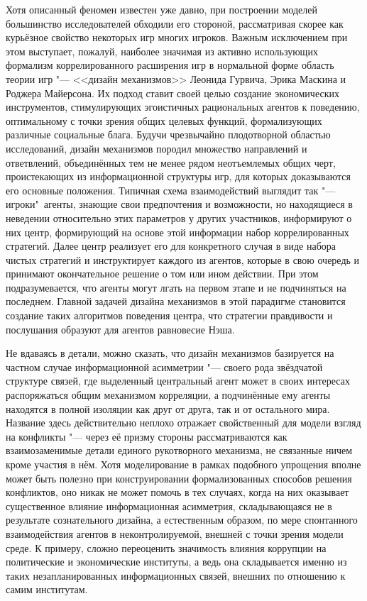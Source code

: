 Хотя описанный феномен известен уже давно, при построении моделей большинство исследователей обходили его стороной, рассматривая скорее как курьёзное свойство некоторых игр многих игроков. Важным исключением при этом выступает, пожалуй, наиболее значимая из активно использующих формализм коррелированного расширения игр в нормальной форме область теории игр "--- <<дизайн механизмов>> \cite{Nikolenko} Леонида Гурвича, Эрика Маскина и Роджера Майерсона. Их подход ставит своей целью создание экономических инструментов, стимулирующих эгоистичных рациональных агентов к поведению, оптимальному с точки зрения общих целевых функций, формализующих различные социальные блага. Будучи чрезвычайно плодотворной областью исследований, дизайн механизмов породил множество направлений и ответвлений, объединённых тем не менее рядом неотъемлемых общих черт, проистекающих из информационной структуры игр, для которых доказываются его основные положения. Типичная схема взаимодействий выглядит так "--- игроки"~агенты, знающие свои предпочтения и возможности, но находящиеся в неведении относительно этих параметров у других участников, информируют о них центр, формирующий на основе этой информации набор коррелированных стратегий. Далее центр реализует его для конкретного случая в виде набора чистых стратегий и инструктирует каждого из агентов, которые в свою очередь и принимают окончательное решение о том или ином действии. При этом подразумевается, что агенты могут лгать на первом этапе и не подчиняться на последнем. Главной задачей дизайна механизмов в этой парадигме становится создание таких алгоритмов поведения центра, что стратегии правдивости и послушания образуют для агентов равновесие Нэша.

Не вдаваясь в детали, можно сказать, что дизайн механизмов базируется на частном случае информационной асимметрии "--- своего рода звёздчатой структуре связей, где выделенный центральный агент может в своих интересах распоряжаться общим механизмом корреляции, а подчинённые ему агенты находятся в полной изоляции как друг от друга, так и от остального мира. Название здесь действительно неплохо отражает свойственный для модели взгляд на конфликты "--- через её призму стороны рассматриваются как взаимозаменимые детали единого рукотворного механизма, не связанные ничем кроме участия в нём. Хотя моделирование в рамках подобного упрощения вполне может быть полезно при конструировании формализованных способов решения конфликтов, оно никак не может помочь в тех случаях, когда на них оказывает существенное влияние информационная асимметрия, складывающаяся не в результате сознательного дизайна, а естественным образом, по мере спонтанного взаимодействия агентов в неконтролируемой, внешней с точки зрения модели среде. К примеру, сложно переоценить значимость влияния коррупции на политические и экономические институты, а ведь она складывается именно из таких незапланированных информационных связей, внешних по отношению к самим институтам.

